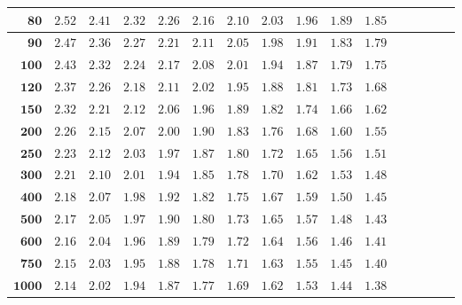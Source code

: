 \begin{customTableWrapper}{1.4}
\begin{longtable}{|r|r|r|r|r|r|r|r|r|r|r|r|r|r|r|r|}
    ${\mathbf{80}}$  & ${2.52}$    & ${2.41}$    & ${2.32}$    & ${2.26}$    & ${2.16}$    & ${2.10}$    & ${2.03}$    & ${1.96}$    & ${1.89}$    & ${1.85}$   \\ \hline 
    ${\mathbf{90}}$  & ${2.47}$    & ${2.36}$    & ${2.27}$    & ${2.21}$    & ${2.11}$    & ${2.05}$    & ${1.98}$    & ${1.91}$    & ${1.83}$    & ${1.79}$   \\ \hline 
    ${\mathbf{100}}$  & ${2.43}$    & ${2.32}$    & ${2.24}$    & ${2.17}$    & ${2.08}$    & ${2.01}$    & ${1.94}$    & ${1.87}$    & ${1.79}$    & ${1.75}$   \\ \hline 
    ${\mathbf{120}}$  & ${2.37}$    & ${2.26}$    & ${2.18}$    & ${2.11}$    & ${2.02}$    & ${1.95}$    & ${1.88}$    & ${1.81}$    & ${1.73}$    & ${1.68}$   \\ \hline 
    ${\mathbf{150}}$  & ${2.32}$    & ${2.21}$    & ${2.12}$    & ${2.06}$    & ${1.96}$    & ${1.89}$    & ${1.82}$    & ${1.74}$    & ${1.66}$    & ${1.62}$   \\ \hline 
    ${\mathbf{200}}$  & ${2.26}$    & ${2.15}$    & ${2.07}$    & ${2.00}$    & ${1.90}$    & ${1.83}$    & ${1.76}$    & ${1.68}$    & ${1.60}$    & ${1.55}$   \\ \hline 
    ${\mathbf{250}}$  & ${2.23}$    & ${2.12}$    & ${2.03}$    & ${1.97}$    & ${1.87}$    & ${1.80}$    & ${1.72}$    & ${1.65}$    & ${1.56}$    & ${1.51}$   \\ \hline 
    ${\mathbf{300}}$  & ${2.21}$    & ${2.10}$    & ${2.01}$    & ${1.94}$    & ${1.85}$    & ${1.78}$    & ${1.70}$    & ${1.62}$    & ${1.53}$    & ${1.48}$   \\ \hline 
    ${\mathbf{400}}$  & ${2.18}$    & ${2.07}$    & ${1.98}$    & ${1.92}$    & ${1.82}$    & ${1.75}$    & ${1.67}$    & ${1.59}$    & ${1.50}$    & ${1.45}$   \\ \hline 
    ${\mathbf{500}}$  & ${2.17}$    & ${2.05}$    & ${1.97}$    & ${1.90}$    & ${1.80}$    & ${1.73}$    & ${1.65}$    & ${1.57}$    & ${1.48}$    & ${1.43}$   \\ \hline 
    ${\mathbf{600}}$  & ${2.16}$    & ${2.04}$    & ${1.96}$    & ${1.89}$    & ${1.79}$    & ${1.72}$    & ${1.64}$    & ${1.56}$    & ${1.46}$    & ${1.41}$   \\ \hline 
    ${\mathbf{750}}$  & ${2.15}$    & ${2.03}$    & ${1.95}$    & ${1.88}$    & ${1.78}$    & ${1.71}$    & ${1.63}$    & ${1.55}$    & ${1.45}$    & ${1.40}$   \\ \hline 
    ${\mathbf{1000}}$  & ${2.14}$    & ${2.02}$    & ${1.94}$    & ${1.87}$    & ${1.77}$    & ${1.69}$    & ${1.62}$    & ${1.53}$    & ${1.44}$    & ${1.38}$   \\ \hline 
\end{longtable}
\end{customTableWrapper}
\changefontsizes{11pt}

\renewcommand{\arraystretch}{1}










